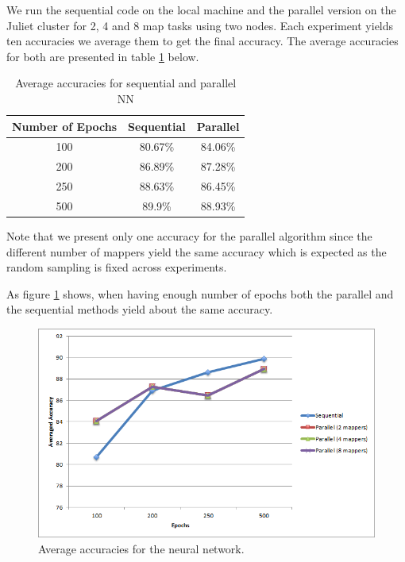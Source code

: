 \documentclass{sig-alternate-05-2015}
\begin{document}
We run the sequential code on the local machine and the parallel version on the Juliet cluster for 2, 4 and 8 map tasks using two nodes. Each experiment yields ten accuracies we average them to get the final accuracy. The average accuracies for both are presented in table \ref{res} below.

\begin{table} [h]
\centering
\caption{Average accuracies for sequential and parallel NN} 
\begin{tabular}{|c|c|c|} \hline
Number of Epochs&Sequential&Parallel\\ \hline
100&80.67\%&84.06\%\\ \hline
200&86.89\%&87.28\%\\ \hline
250&88.63\%&86.45\%\\ \hline
500&89.9\%&88.93\%\\ \hline
\end{tabular}
\label{res}
\end{table}
		
Note that we present only one accuracy for the parallel algorithm since the different number of mappers yield the same accuracy which is expected as the random sampling is fixed across experiments. 

As figure \ref{acc_NN} shows, when having enough number of epochs both the parallel and the sequential methods yield about the same accuracy. 
\begin{figure}[h!]
\centering
\includegraphics[width=\columnwidth]{img/accuracies}
\caption{Average accuracies for the neural network.}
\label{acc_NN}
\end{figure}
\end{document}
